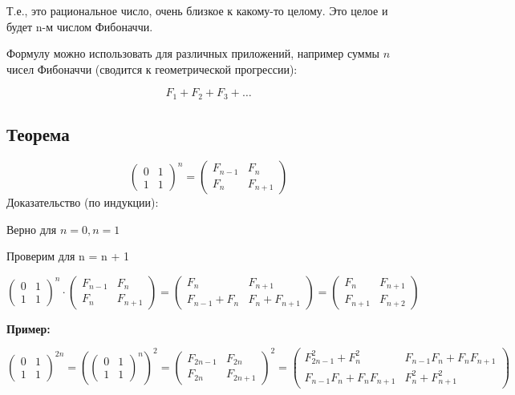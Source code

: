 Т.е., это рациональное число, очень близкое к какому-то целому. Это целое и будет n-м числом Фибоначчи.

Формулу можно использовать для различных приложений, например суммы $ n $ чисел Фибоначчи (сводится к геометрической прогрессии):

$$
F_1 + F_2 + F_3 + \ldots 
$$

\subsection{Теорема}

$$
\begin{pmatrix}
0 & 1 \\
1 & 1
\end{pmatrix}^{n}
=
\begin{pmatrix}
F_{n-1} & F_{n} \\
F_{n} & F_{n+1}
\end{pmatrix}
$$
Доказательство (по индукции):

Верно для $ n=0, n=1 $

Проверим для n = n + 1

$$
\begin{pmatrix}
0 & 1 \\
1 & 1
\end{pmatrix}^{n}
\cdot
\begin{pmatrix}
F_{n-1} & F_{n} \\
F_{n} & F_{n+1}
\end{pmatrix}
=
\begin{pmatrix}
F_{n} & F_{n+1} \\
F_{n-1} + F_{n} & F_{n} + F_{n+1}
\end{pmatrix}
=
\begin{pmatrix}
F_{n} & F_{n+1} \\
F_{n+1} & F_{n+2}
\end{pmatrix}
$$

\textbf{Пример:}

$$
\begin{pmatrix}
0 & 1 \\
1 & 1
\end{pmatrix}^{2n}
=
\left(
\begin{pmatrix}
0 & 1 \\
1 & 1
\end{pmatrix}^{n}
\right)^{2}
=
\begin{pmatrix}
F_{2n-1} & F_{2n} \\
F_{2n} & F_{2n+1}
\end{pmatrix}^{2}
= 
\begin{pmatrix}
F_{2n-1}^{2} + F_{n}^{2} & F_{n-1} F_{n} + F_{n} F_{n+1} \\
F_{n-1} F_{n} + F_{n} F_{n+1} & F_{n}^{2} + F_{n+1}^{2}
\end{pmatrix}
$$

